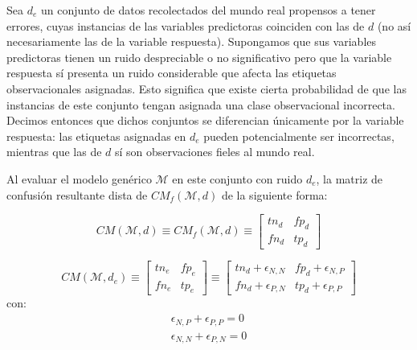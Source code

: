 \iffalse 
\[
CM \equiv 
\begin{bmatrix}
\lambda_{N,N} (n-n\pi_{P}) & (1-\lambda_{N,N}) (n-n\pi_{P}) \\
(1-\lambda_{P,P}) n\pi_{P}   & \lambda_{P,P} n\pi_{P} 
\end{bmatrix}
\]
\fi 



Sea $d_{e}$ un conjunto de datos recolectados del mundo real propensos a tener errores, cuyas instancias de las variables predictoras coinciden con las de $d$ (no así necesariamente las de la variable respuesta). Supongamos que sus variables predictoras tienen un ruido despreciable o no significativo pero que la variable respuesta sí presenta un ruido considerable que afecta las etiquetas observacionales asignadas. Esto significa que existe cierta probabilidad de que las instancias de este conjunto tengan asignada una clase observacional incorrecta. Decimos entonces que dichos conjuntos se diferencian únicamente por la variable respuesta: las etiquetas asignadas en $d_{e}$ pueden potencialmente ser incorrectas, mientras que las de $d$ sí son observaciones fieles al mundo real.


Al evaluar el modelo genérico $\mathcal{M}$ en este conjunto con ruido $d_{e}$, la matriz de confusión resultante dista de $CM_f(\mathcal{M}, d)$ de la siguiente forma: %


\[
CM(\mathcal{M}, d) \equiv 
CM_{f}(\mathcal{M}, d) \equiv 
\begin{bmatrix}
tn_{d} & fp_{d} \\
fn_{d} & tp_{d}
\end{bmatrix}
\]


\[
CM(\mathcal{M}, d_{e}) \equiv 
\begin{bmatrix}
tn_{e} & fp_{e}\\
fn_{e} & tp_{e}
\end{bmatrix}
\equiv 
\begin{bmatrix}
tn_{d}  + \epsilon_{N,N} & fp_{d} + \epsilon_{N,P} \\
fn_{d} + \epsilon_{P,N} & tp_{d} + \epsilon_{P,P}
\end{bmatrix}
\]
con:
\begin{gather*}
\epsilon_{N,P} + \epsilon_{P,P} = 0 \\
\epsilon_{N,N} + \epsilon_{P,N} = 0
\end{gather*}


